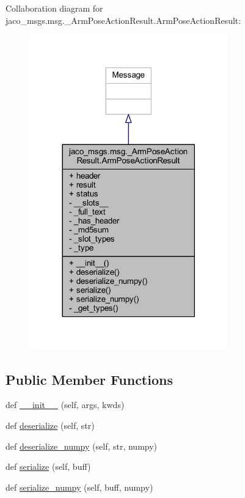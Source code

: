 Collaboration diagram for jaco\+\_\+msgs.\+msg.\+\_\+\+Arm\+Pose\+Action\+Result.\+Arm\+Pose\+Action\+Result\+:
\nopagebreak
\begin{figure}[H]
\begin{center}
\leavevmode
\includegraphics[width=242pt]{da/d11/classjaco__msgs_1_1msg_1_1__ArmPoseActionResult_1_1ArmPoseActionResult__coll__graph}
\end{center}
\end{figure}
\subsection*{Public Member Functions}
\begin{DoxyCompactItemize}
\item 
def \hyperlink{classjaco__msgs_1_1msg_1_1__ArmPoseActionResult_1_1ArmPoseActionResult_a9167230e26c73cc9369a7bf17051b99f}{\+\_\+\+\_\+init\+\_\+\+\_\+} (self, args, kwds)
\item 
def \hyperlink{classjaco__msgs_1_1msg_1_1__ArmPoseActionResult_1_1ArmPoseActionResult_aad6bbbfe71f9b7b895ba58834fa443e5}{deserialize} (self, str)
\item 
def \hyperlink{classjaco__msgs_1_1msg_1_1__ArmPoseActionResult_1_1ArmPoseActionResult_a32c659d486a7a260933ae8ce72a2fcb7}{deserialize\+\_\+numpy} (self, str, numpy)
\item 
def \hyperlink{classjaco__msgs_1_1msg_1_1__ArmPoseActionResult_1_1ArmPoseActionResult_aa312eb80e71e42b86d1a6da65b6b93f8}{serialize} (self, buff)
\item 
def \hyperlink{classjaco__msgs_1_1msg_1_1__ArmPoseActionResult_1_1ArmPoseActionResult_af1c510052d0402eccba7a5afd2238b45}{serialize\+\_\+numpy} (self, buff, numpy)
\end{DoxyCompactItemize}
